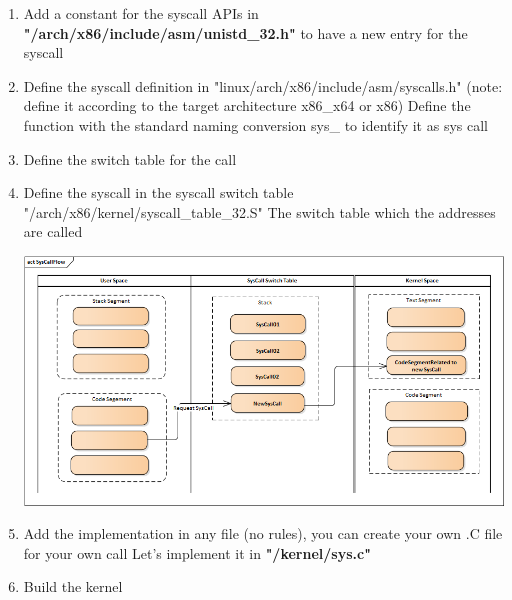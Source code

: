 \documentclass{article}
\begin{document}
\begin{enumerate}
    \item Add a constant for the syscall APIs in \textbf{"/arch/x86/include/asm/unistd\_32.h"} to have a new entry for the syscall
        
    
    \item Define the syscall definition in "linux/arch/x86/include/asm/syscalls.h" (note: define it according to the target architecture x86\_x64 or x86) 
    Define the function with the standard naming conversion sys\_ to identify it as sys call
    

    \item Define the switch table for the call
    \item Define the syscall in the syscall switch table "/arch/x86/kernel/syscall\_table\_32.S"
    The switch table which the addresses are called
    
    \begin{center}
        \includegraphics[scale=0.60]{./resources/img/new_syscall.PNG}
    \end{center}

    \item Add the implementation in any file (no rules), you can create your own .C file for your own call
    Let's implement it in \textbf{"/kernel/sys.c"}
    

    \item Build the kernel
\end{enumerate}
\end{document}
